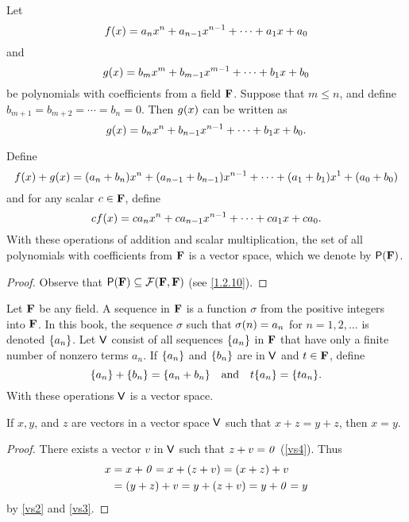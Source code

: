 \begin{eg}\label{1.2.12}
  Let
  \[
    f\p{x} = a_{n} x^{n} + a_{n - 1} x^{n - 1} + \cdots + a_{1} x + a_{0}
  \]
  and
  \[
    g\p{x} = b_{m} x^{m} + b_{m - 1} x^{m - 1} + \cdots + b_{1} x + b_{0}
  \]
  be polynomials with coefficients from a field \(\mathbf{F}\).
  Suppose that \(m \leq n\), and define \(b_{m + 1} = b_{m + 2} = \cdots = b_{n} = 0\).
  Then \(g\p{x}\) can be written as
  \[
    g\p{x} = b_{n} x^{n} + b_{n - 1} x^{n - 1} + \cdots + b_{1} x + b_{0}.
  \]

  Define
  \[
    f\p{x} + g\p{x} = \p{a_{n} + b_{n}} x^{n} + \p{a_{n - 1} + b_{n - 1}} x^{n - 1} + \cdots + \p{a_{1} + b_{1}} x^{1} + \p{a_{0} + b_{0}}
  \]
  and for any scalar \(c \in \mathbf{F}\), define
  \[
    cf\p{x} = ca_{n} x^{n} + ca_{n - 1} x^{n - 1} + \cdots + ca_{1} x + ca_{0}.
  \]
  With these operations of addition and scalar multiplication, the set of all polynomials with coefficients from \(\mathbf{F}\) is a vector space, which we denote by \(\ps{\F}\).
\end{eg}

\begin{proof}
  Observe that \(\ps{\F} \subseteq \fs{\F}{\F}\) (see \cref{1.2.10}).
\end{proof}

\begin{eg}\label{1.2.13}
  Let \(\mathbf{F}\) be any field.
  A sequence in \(\mathbf{F}\) is a function \(\sigma\) from the positive integers into \(\mathbf{F}\).
  In this book, the sequence \(\sigma\) such that \(\sigma\p{n} = a_{n}\) for \(n = 1, 2, \dots\) is denoted \(\left\lbrace a_{n}\right\rbrace\).
  Let \(\mathsf{V}\) consist of all sequences \(\left\lbrace a_{n}\right\rbrace\) in \(\mathbf{F}\) that have only a finite number of nonzero terms \(a_{n}\).
  If \(\left\lbrace a_{n}\right\rbrace\) and \(\left\lbrace b_{n}\right\rbrace\) are in \(\mathsf{V}\) and \(t \in \mathbf{F}\), define
  \[
    \set{a_{n}} + \set{b_{n}} = \set{a_{n} + b_{n}} \quad \text{and} \quad t\set{a_{n}} = \set{ta_{n}}.
  \]
  With these operations \(\mathsf{V}\) is a vector space.
\end{eg}

\begin{thm}\label{1.1}
  If \(x, y\), and \(z\) are vectors in a vector space \(\mathsf{V}\) such that \(x + z = y + z\), then \(x = y\).
\end{thm}

\begin{proof}
  There exists a vector \(v\) in \(\mathsf{V}\) such that \(z + v = \mathit{0}\) (\ref{vs4}).
  Thus
  \begin{align*}
    x & = x + \mathit{0} = x + \left\lparen z + v\right\rparen = \left\lparen x + z\right\rparen + v     \\
      & = \left\lparen y + z\right\rparen + v = y + \left\lparen z + v\right\rparen = y + \mathit{0} = y
  \end{align*}
  by \ref{vs2} and \ref{vs3}.
\end{proof}

